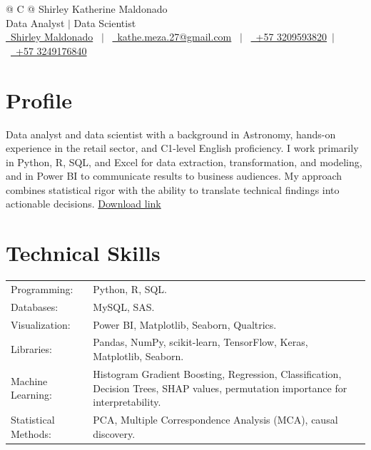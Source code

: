 \documentclass[a4paper, 10pt]{article}
\begin{document}
\pagestyle{empty} 

\begin{tabularx}{\linewidth}{@{} C @{}}
\Huge{Shirley Katherine Maldonado} \\[3pt]
{Data Analyst $|$ Data Scientist}\\[2pt]
\href{https://www.linkedin.com/in/katherine-maldonado-64424b205/}{\raisebox{-0.05\height}\faLinkedin\ Shirley Maldonado} \ $|$ \ 
\href{mailto:kathe.meza.27@gmail.com}{\raisebox{-0.05\height}\faEnvelope \ kathe.meza.27@gmail.com} \ $|$ \ 
\href{tel:+57 3209593820}{\raisebox{-0.05\height}\faMobile \ +57 3209593820}\ $|$ \ \href{tel:+57 3209593820}{\raisebox{-0.05\height}\faMobile \ +57 3249176840} \\
\end{tabularx}

\section{Profile}
Data analyst and data scientist with a background in Astronomy, hands-on experience in the retail sector, and C1-level English proficiency. I work primarily in Python, R, SQL, and Excel for data extraction, transformation, and modeling, and in Power BI to communicate results to business audiences. My approach combines statistical rigor with the ability to translate technical findings into actionable decisions.
\href{https://kikikath.github.io/Hoja-de-Vida/cv.pdf}{Download link}

\section{Technical Skills}
\begin{tabularx}{\linewidth}{@{}l X@{}}
Programming:  &  \normalsize{Python, R, SQL.}\\
Databases:    &  \normalsize{MySQL, SAS.}\\
Visualization: &  \normalsize{Power BI, Matplotlib, Seaborn, Qualtrics.}\\
Libraries:    &  \normalsize{Pandas, NumPy, scikit-learn, TensorFlow, Keras, Matplotlib, Seaborn.}\\
Machine Learning: &  \normalsize{Histogram Gradient Boosting, Regression, Classification, Decision Trees, SHAP values, permutation importance for interpretability.}\\  
Statistical Methods: &  \normalsize{PCA, Multiple Correspondence Analysis (MCA), causal discovery.}\\
\end{tabularx}
\end{document}
